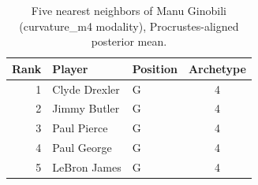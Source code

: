 \begin{table}[htbp]
  \centering\small
  \begin{tabular}{rllc}
    \toprule
    Rank & Player & Position & Archetype \\
    \midrule
    1 & Clyde Drexler & G & 4 \\
    2 & Jimmy Butler & G & 4 \\
    3 & Paul Pierce & G & 4 \\
    4 & Paul George & G & 4 \\
    5 & LeBron James & G & 4 \\
    \bottomrule
  \end{tabular}
  \caption{Five nearest neighbors of Manu Ginobili (curvature_m4 modality), Procrustes-aligned posterior mean.}
  \label{tab:Manu_Ginobili_neighbors_curvature_m4}
\end{table}

